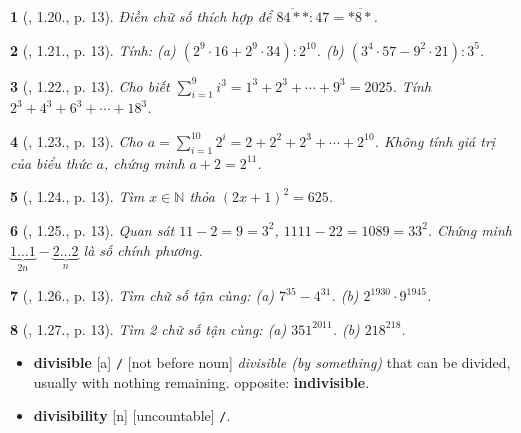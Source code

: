 \documentclass{article}
\newtheorem{baitoan}{}
\begin{document}
\begin{baitoan}[\cite{TLCT_THCS_Toan_6_so_hoc}, 1.20., p. 13]
	Điền chữ số thích hợp để $\overline{84**}:47 = \overline{*8*}$.
\end{baitoan}

\begin{baitoan}[\cite{TLCT_THCS_Toan_6_so_hoc}, 1.21., p. 13]
	Tính: (a) $(2^9\cdot16 + 2^9\cdot34):2^{10}$. (b) $(3^4\cdot57 - 9^2\cdot21):3^5$.
\end{baitoan}

\begin{baitoan}[\cite{TLCT_THCS_Toan_6_so_hoc}, 1.22., p. 13]
	Cho biết $\sum_{i=1}^9 i^3 = 1^3 + 2^3 + \cdots + 9^3 = 2025$. Tính $2^3 + 4^3 + 6^3 + \cdots + 18^3$.
\end{baitoan}

\begin{baitoan}[\cite{TLCT_THCS_Toan_6_so_hoc}, 1.23., p. 13]
	Cho $a = \sum_{i=1}^{10} 2^i = 2 + 2^2 + 2^3 + \cdots + 2^{10}$. Không tính giá trị của biểu thức $a$, chứng minh $a + 2 = 2^11$.
\end{baitoan}

\begin{baitoan}[\cite{TLCT_THCS_Toan_6_so_hoc}, 1.24., p. 13]
	Tìm $x\in\mathbb{N}$ thỏa $(2x + 1)^2 = 625$.
\end{baitoan}

\begin{baitoan}[\cite{TLCT_THCS_Toan_6_so_hoc}, 1.25., p. 13]
	Quan sát $11 - 2 = 9 = 3^2$, $1111 - 22 = 1089 = 33^2$. Chứng minh $\underbrace{1\ldots1}_{2n} - \underbrace{2\ldots2}_n$ là số chính phương.
\end{baitoan}

\begin{baitoan}[\cite{TLCT_THCS_Toan_6_so_hoc}, 1.26., p. 13]
	Tìm chữ số tận cùng: (a) $7^{35} - 4^{31}$. (b) $2^{1930}\cdot9^{1945}$.
\end{baitoan}

\begin{baitoan}[\cite{TLCT_THCS_Toan_6_so_hoc}, 1.27., p. 13]
	Tìm 2 chữ số tận cùng: (a) $351^{2011}$. (b) $218^{218}$.
\end{baitoan}


\begin{itemize}\sf
	\item \textbf{divisible} [a] {\tt/} [not before noun] \textit{divisible (by something)} that can be divided, usually with nothing remaining. {\sc opposite}: \textbf{indivisible}.
	\item \textbf{divisibility}  [n] [uncountable] {\tt/}.
\end{itemize}
\end{document}
